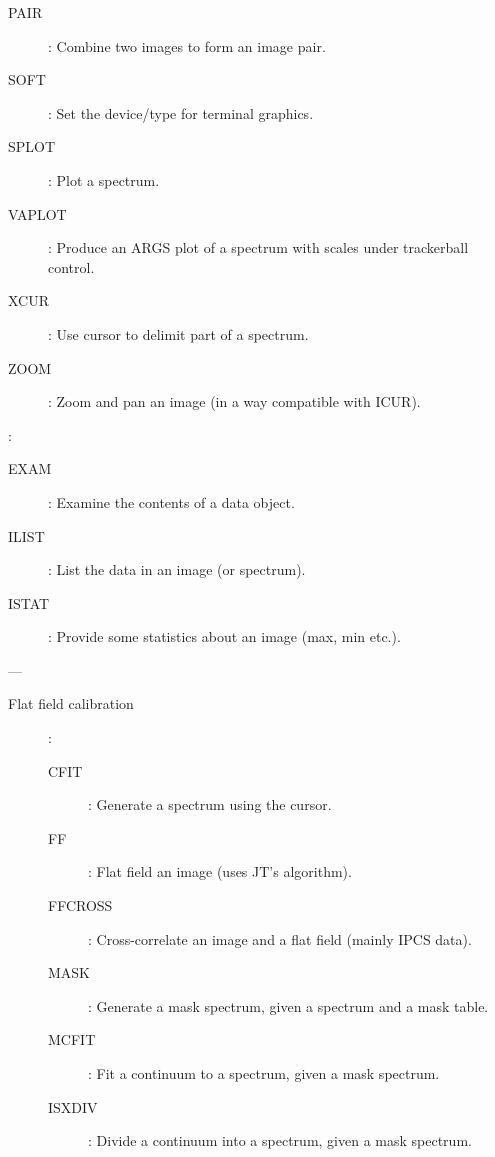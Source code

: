 \begin {description}
\begin{description}
\begin{description}
\item [PAIR]: Combine two images to form an image pair.
\item [SOFT]: Set the device/type for terminal graphics.
\item [SPLOT]: Plot a spectrum.
\item [VAPLOT]: Produce an ARGS plot of a spectrum with scales under trackerball control.
\item [XCUR]: Use cursor to delimit part of a spectrum.
\item [ZOOM]: Zoom and pan an image (in a way compatible with ICUR).
\end{description}

\item [On non-graphics devices]\hspace{-1.5mm}:
\begin{description}
\item [EXAM]: Examine the contents of a data object.
\item [ILIST]: List the data in an image (or spectrum).
\item [ISTAT]: Provide some statistics about an image (max, min etc.).
\end{description}

\end{description}

\item [CALIBRATION] ---

\begin{description}
\item [Flat field calibration]\hspace{-1.5mm}:
\begin{description}
\item [CFIT]: Generate a spectrum using the cursor.
\item [FF]: Flat field an image (uses JT's algorithm).
\item [FFCROSS]: Cross-correlate an image and a flat field (mainly IPCS data).
\item [MASK]: Generate a mask spectrum, given a spectrum and a mask table.
\item [MCFIT]: Fit a continuum to a spectrum, given a mask spectrum.
\item [ISXDIV]: Divide a continuum into a spectrum, given a mask spectrum.
\end{description}


\end{description}
\end{description}
